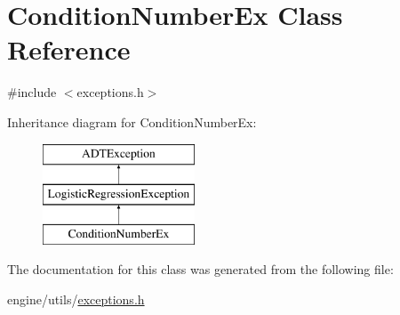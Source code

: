 \hypertarget{classConditionNumberEx}{
\section{ConditionNumberEx Class Reference}
\label{classConditionNumberEx}
}


{\ttfamily \#include $<$exceptions.h$>$}

Inheritance diagram for ConditionNumberEx:\begin{figure}[H]
\begin{center}
\leavevmode
\includegraphics[height=3cm]{classConditionNumberEx}
\end{center}
\end{figure}


The documentation for this class was generated from the following file:\begin{DoxyCompactItemize}
\item 
engine/utils/\hyperlink{exceptions_8h}{exceptions.h}\end{DoxyCompactItemize}
